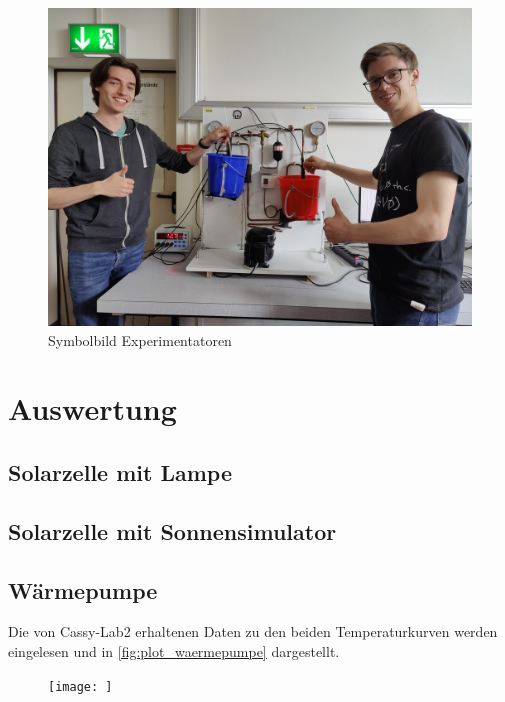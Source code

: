 \documentclass[english, ngerman]{scrartcl}
\begin{document}
%
\begin{figure}[H]
    \centering
    \begin{samepage}
        \includegraphics[width=0.6\linewidth]{fig/Spass1.jpeg}
        \caption[Symbolbild Experimentatoren]{Symbolbild Experimentatoren}
        \label{fig:umruehren}
    \end{samepage}
\end{figure}



\section{Auswertung}
\label{sec:auswertung}

\subsection{Solarzelle mit Lampe}
\label{subsec:auswertung_solar_lampe}

\subsection{Solarzelle mit Sonnensimulator}
\label{subsec:auswertung_solar_sonnensimulator}

\subsection{Wärmepumpe}
\label{subsec:auswertung_waermepumpe}

Die von Cassy-Lab2 erhaltenen Daten zu den beiden Temperaturkurven werden eingelesen und in \autoref{fig:plot_waermepumpe} dargestellt.

\begin{figure}[H]
    \centering
    \begin{samepage}
        \texttt{[image: ]}
        \caption[]{}
        \label{fig:}
    \end{samepage}
\end{figure}
\end{document}
